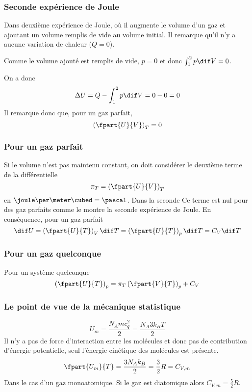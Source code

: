 \subsubsection{Seconde expérience de Joule}
Dans deuxième expérience de Joule,
où il augmente le volume d'un gaz et ajoutant
un volume remplis de vide au volume initial.
Il remarque qu'il n'y a aucune variation de chaleur ($Q = 0$).

Comme le volume ajouté est remplis de vide, $p = 0$ et donc
$\int_1^2 p \dif V = 0$.

On a donc
\[ \Delta U = Q - \int_1^2 p \dif V  = 0 - 0 = 0 \]
Il remarque donc que, pour un gaz parfait,
\[ \left(\fpart{U}{V}\right)_T = 0 \]

\subsubsection{Pour un gaz parfait}
Si le volume n'est pas maintenu constant,
on doit considérer le deuxième terme de la différentielle
\[ \pi_T = \left(\fpart{U}{V}\right)_T \]
en $\joule\per\meter\cubed = \pascal$.
Dans la seconde
Ce terme est nul pour des gaz parfaits comme le montre
la seconde expérience de Joule.
En conséquence, pour un gaz parfait
\begin{equation}
  \dif U = \left(\fpart{U}{T}\right)_V \dif T =
  \left(\fpart{U}{T}\right)_p \dif T = C_V\dif T \label{eq:peru}
\end{equation}

\subsubsection{Pour un gaz quelconque}
Pour un système quelconque
\begin{equation}
  \left(\fpart{U}{T}\right)_p =
  \pi_T \left(\fpart{V}{T}\right)_p + C_V \label{eq:dudtp}
\end{equation}

\subsubsection{Le point de vue de la mécanique statistique}
\[ U_m = \frac{N_A mc_q^2}{2} = \frac{N_A 3k_BT}{2} \]
Il n'y a pas de force d'interaction entre les molécules et
donc pas de contribution d'énergie potentielle,
seul l'énergie cinétique des molécules est présente.
\[ \fpart{U_m}{T} = \frac{3N_A k_B}{2} = \frac 32R = C_{V,m} \]
Dans le cas d'un gaz monoatomique.
Si le gaz est diatomique alors $C_{V,m} = \frac 52R$.

